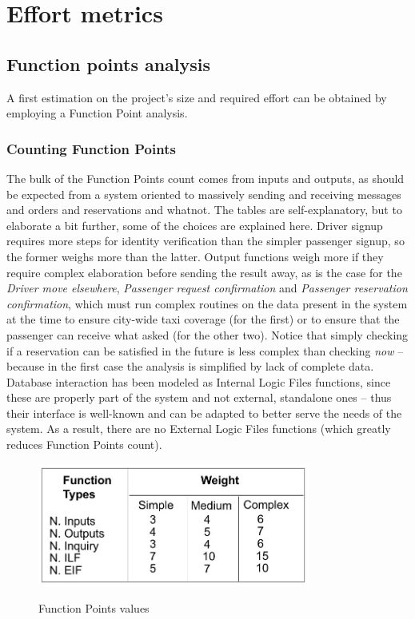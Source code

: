 \chapter{Effort metrics}


\section{Function points analysis}
A first estimation on the project's size and required effort can be obtained by employing a Function Point analysis.

\subsection{Counting Function Points}
The bulk of the Function Points count comes from inputs and outputs, as should be expected from a system oriented to massively sending and receiving messages and orders and reservations and whatnot. The tables are self-explanatory, but to elaborate a bit further, some of the choices are explained here. Driver signup requires more steps for identity verification than the simpler passenger signup, so the former weighs more than the latter. Output functions weigh more if they require complex elaboration before sending the result away, as is the case for the \emph{Driver move elsewhere}, \emph{Passenger request confirmation} and \emph{Passenger reservation confirmation}, which must run complex routines on the data present in the system at the time to ensure city-wide taxi coverage (for the first) or to ensure that the passenger can receive what asked (for the other two). Notice that simply checking if a reservation can be satisfied in the future is less complex than checking \emph{now} -- because in the first case the analysis is simplified by lack of complete data. Database interaction has been modeled as Internal Logic Files functions, since these are properly part of the system and not external, standalone ones -- thus their interface is well-known and can be adapted to better serve the needs of the system. As a result, there are no External Logic Files functions (which greatly reduces Function Points count).

\begin{figure}
\centering
\includegraphics[width=0.8\textwidth]{tex-images/FPTable}
\label{fig:functionpoints}
\caption{Function Points values}
\end{figure}


